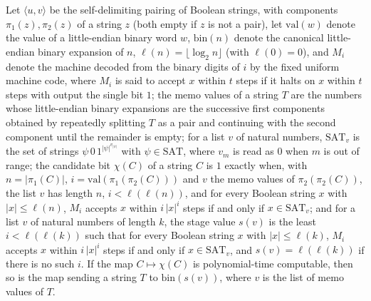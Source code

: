 \begin{theorem}
\label{Complexity.ladner_stage_FP}
\leanok
{}
Let $\langle u,v\rangle$ be the self-delimiting pairing of Boolean strings, with components $\pi_1(z),\pi_2(z)$ of a string $z$ (both empty if $z$ is not a pair), let $\mathrm{val}(w)$ denote the value of a little-endian binary word $w$, $\mathrm{bin}(n)$ denote the canonical little-endian binary expansion of $n$, $\ell(n)=\lfloor\log_2 n\rfloor$ (with $\ell(0)=0$), and $M_i$ denote the machine decoded from the binary digits of $i$ by the fixed uniform machine code, where $M_i$ is said to accept $x$ within $t$ steps if it halts on $x$ within $t$ steps with output the single bit $1$; the memo values of a string $T$ are the numbers whose little-endian binary expansions are the successive first components obtained by repeatedly splitting $T$ as a pair and continuing with the second component until the remainder is empty; for a list $v$ of natural numbers, $\mathrm{SAT}_v$ is the set of strings $\psi\,0\,1^{|\psi|^{v_{|\psi|}}}$ with $\psi\in\mathrm{SAT}$, where $v_m$ is read as $0$ when $m$ is out of range; the candidate bit $\chi(C)$ of a string $C$ is $1$ exactly when, with $n=|\pi_1(C)|$, $i=\mathrm{val}(\pi_1(\pi_2(C)))$ and $v$ the memo values of $\pi_2(\pi_2(C))$, the list $v$ has length $n$, $i<\ell(\ell(n))$, and for every Boolean string $x$ with $|x|\le\ell(n)$, $M_i$ accepts $x$ within $i\,|x|^i$ steps if and only if $x\in\mathrm{SAT}_v$; and for a list $v$ of natural numbers of length $k$, the stage value $s(v)$ is the least $i<\ell(\ell(k))$ such that for every Boolean string $x$ with $|x|\le\ell(k)$, $M_i$ accepts $x$ within $i\,|x|^i$ steps if and only if $x\in\mathrm{SAT}_v$, and $s(v)=\ell(\ell(k))$ if there is no such $i$. If the map
$C\mapsto\chi(C)$ is polynomial-time computable, then so is the map sending a string $T$ to
$\mathrm{bin}(s(v))$, where $v$ is the list of memo values of $T$.
\end{theorem}

